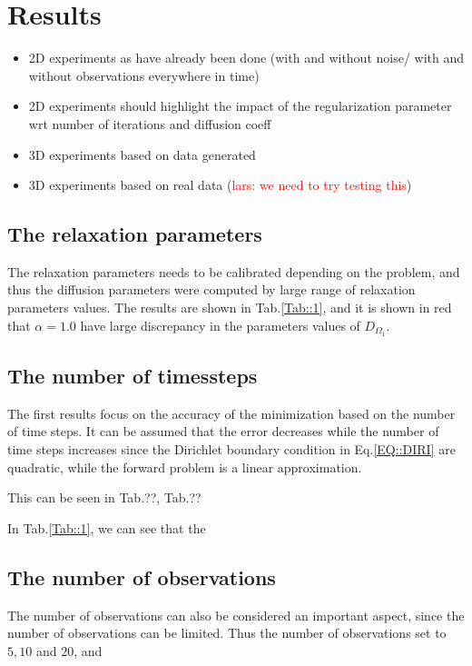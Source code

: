 \documentclass[11pt,a4paper]{article}
\renewcommand{\comment}[1]{\textcolor{red}{#1}}
\begin{document}
\section{Results}
\begin{itemize}
\item 2D experiments as have already been done (with and without noise/ with and without observations everywhere in time) 
\item 2D experiments should highlight the impact of the regularization parameter wrt number of iterations and diffusion 
coeff 
\item 3D experiments based on data generated  
\item 3D experiments based on real data (\comment{lars: we need to try testing this}) 
\end{itemize}

\subsection{The relaxation parameters}
The relaxation parameters needs to be calibrated depending on the problem, and thus the diffusion parameters were computed by large range of relaxation parameters values. The results are shown in Tab.\ref{Tab::1}, and it is shown in red that $\alpha=1.0$ have large discrepancy in the parameters values of $D_{\Omega_1}$. 



\subsection{The number of timessteps}
The first results focus on the accuracy of the minimization based on the number of time steps. It can be assumed that the error decreases  while the number of time steps increases since the Dirichlet boundary condition in Eq.\ref{EQ::DIRI} are quadratic, while the forward problem is a linear approximation. 

This can be seen in Tab.??, Tab.??





In Tab.\ref{Tab::1}, we can see that the 

\subsection{The number of observations}
The number of observations can also be considered an important aspect, since the number of observations can be limited. Thus the number of observations set to $5,10 $ and $20$, and  
\end{document}
